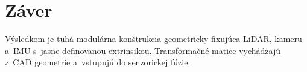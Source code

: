 \section{Záver}
Výsledkom je tuhá modulárna konštrukcia geometricky fixujúca LiDAR, kameru a~IMU s~jasne
definovanou extrinsikou. Transformačné matice vychádzajú z~CAD geometrie a~vstupujú do senzorickej
fúzie.
